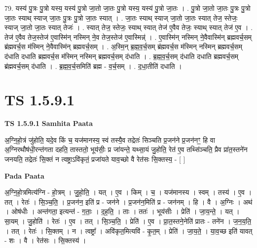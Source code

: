 \documentclass[17pt]{extarticle}
\begin{document}
79. यस्य॑ पु॒त्रः पु॒त्रो यस्य॒ यस्य॑ पु॒त्रो जा॒तो जा॒तः पु॒त्रो यस्य॒ यस्य॑ पु॒त्रो जा॒तः । . पु॒त्रो जा॒तो जा॒तः पु॒त्रः पु॒त्रो जा॒तः स्याथ् स्याज् जा॒तः पु॒त्रः पु॒त्रो जा॒तः स्यात् । . जा॒तः स्याथ् स्याज् जा॒तो जा॒तः स्यात् तेज॒ स्तेजः॒ स्याज् जा॒तो जा॒तः स्यात् तेजः॑ । . स्यात् तेज॒ स्तेजः॒ स्याथ् स्यात् तेज॑ ए॒वैव तेजः॒ स्याथ् स्यात् तेज॑ ए॒व । . तेज॑ ए॒वैव तेज॒स्तेज॑ ए॒वास्मि॑न् नस्मिन् ने॒व तेज॒स्तेज॑ ए॒वास्मिन्न्॑ । . ए॒वास्मि॑न् नस्मिन् ने॒वैवास्मि॑न् ब्रह्मवर्च॒सम् ब्र॑ह्मवर्च॒स म॑स्मिन् ने॒वैवास्मि॑न् ब्रह्मवर्च॒सम् । . अ॒स्मि॒न् ब्र॒ह्म॒व॒र्च॒सम् ब्र॑ह्मवर्च॒स म॑स्मिन् नस्मिन् ब्रह्मवर्च॒सम् द॑धाति दधाति ब्रह्मवर्च॒स म॑स्मिन् नस्मिन् ब्रह्मवर्च॒सम् द॑धाति । . ब्र॒ह्म॒व॒र्च॒सम् द॑धाति दधाति ब्रह्मवर्च॒सम् ब्र॑ह्मवर्च॒सम् द॑धाति । . ब्र॒ह्म॒व॒र्च॒समिति॑ ब्रह्म - व॒र्च॒सम् । . द॒धा॒तीति॑ दधाति । \newline
\pagebreak
{}
\section*{ TS 1.5.9.1 }

\textbf{TS 1.5.9.1 } \newline
\textbf{Samhita Paata} \newline

अ॒ग्नि॒हो॒त्रं जु॑होति॒ यदे॒व किं च॒ यज॑मानस्य॒ स्वं तस्यै॒व तद्रेतः॑ सिञ्चति प्र॒जन॑ने प्र॒जन॑नꣳ॒॒ हि वा अ॒ग्निरथौष॑धी॒रन्त॑गता दहति॒ तास्ततो॒ भूय॑सीः॒ प्र जा॑यन्ते॒ यथ्सा॒यं जु॒होति॒ रेत॑ ए॒व तथ्सि॑ञ्चति॒ प्रैव प्रा॑त॒स्तने॑न जनयति॒ तद्रेतः॑ सि॒क्तं न त्वष्ट्राऽवि॑कृतं॒ प्रजा॑यते याव॒च्छो वै रेत॑सः सि॒क्तस्य॒ - [ ] \newline

\textbf{Pada Paata} \newline

अ॒ग्नि॒हो॒त्रमित्य॑ग्नि - हो॒त्रम् । जु॒हो॒ति॒ । यत् । ए॒व । किम् । च॒ । यज॑मानस्य । स्वम् । तस्य॑ । ए॒व । तत् । रेतः॑ । सि॒ञ्च॒ति॒ । प्र॒जन॑न॒ इति॑ प्र - जन॑ने । प्र॒जन॑न॒मिति॑ प्र - जन॑नम् । हि । वै । अ॒ग्निः । अथ॑ । ओष॑धीः । अन्त॑गता॒ इत्यन्त॑ - ग॒ताः॒ । द॒ह॒ति॒ । ताः । ततः॑ । भूय॑सीः । प्रेति॑ । जा॒य॒न्ते॒ । यत् । सा॒यम् । जु॒होति॑ । रेतः॑ । ए॒व । तत् । सि॒ञ्च॒ति॒ । प्रेति॑ । ए॒व । प्रा॒त॒स्तने॒नेति॑ प्रातः - तने॑न । ज॒न॒य॒ति॒ । तत् । रेतः॑ । सि॒क्तम् । न । त्वष्ट्रा᳚ । अवि॑कृत॒मित्यवि॑ - कृ॒त॒म् । प्रेति॑ । जा॒य॒ते॒ । या॒व॒च्छ इति॑ यावत् - शः । वै । रेत॑सः । सि॒क्तस्य॑ ।  \newline
\end{document}
